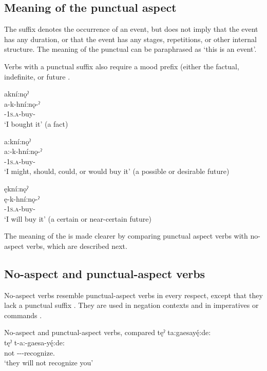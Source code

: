 \subsection{Meaning of the punctual aspect} \label{Meaning of the punctual aspect}
The  {\punctual} suffix denotes the occurrence of an event, but does not imply that the event has any duration, or that the event has any stages, repetitions, or other internal structure. The meaning of the punctual can be paraphrased as ‘this is an event’.

Verbs with a punctual suffix also require a mood prefix (either the factual, indefinite, or future . 

\ea\label{ex:punctaspectex100}
\ea akní:nǫˀ\\
\gll a-k-hní:nǫ-ˀ\\
{\factual}-\textsc{1s.a}-buy-{\punctual}\\
\glt ‘I bought it’ (a fact)

\ex a:kní:nǫˀ\\
\gll a:-k-hní:nǫ-ˀ\\
{\indefinite}-\textsc{1s.a}-buy-{\punctual}\\
\glt ‘I might, should, could, or would buy it’ (a possible or desirable future)

\ex ękní:nǫˀ\\
\gll ę-k-hní:nǫ-ˀ\\
\fut-\textsc{1s.a}-buy-{\punctual}\\
\glt ‘I will buy it’ (a certain or near-certain future)
\z
\z

The meaning of the  {\punctual} is made clearer by comparing punctual aspect verbs with no-aspect verbs, which are described next.

\subsection{No-aspect and punctual-aspect verbs} \label{No-aspect and punctual aspect verbs}
No-aspect verbs resemble punctual-aspect verbs in every respect, except that they lack a punctual suffix . They are used in negation contexts  and in imperatives or commands . 

\newpage
\ea\label{ex:punctendex4} No-aspect and punctual-aspect verbs, compared
\ea tęˀ ta:gaesayę́:de:\\\label{ex:punctendex4a}
\gll tęˀ t-a:-gaesa-yę́:de:\\
not {\contrastive}-{\indefinite}--recognize.{\noaspect}\\
\glt ‘they will not recognize you’

